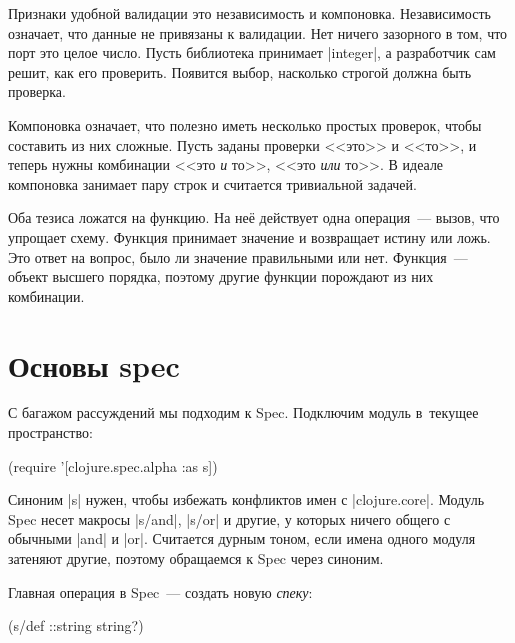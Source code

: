 
Признаки удобной валидации это независимость и компоновка. Независимость
означает, что данные не привязаны к валидации. Нет ничего зазорного в том, что
порт это целое число. Пусть библиотека принимает \spverb|integer|, а разработчик
сам решит, как его проверить. Появится выбор, насколько строгой должна быть
проверка.


Компоновка означает, что полезно иметь несколько простых проверок, чтобы
составить из них сложные. Пусть заданы проверки <<это>> и <<то>>, и теперь нужны
комбинации <<это \emph{и} то>>, <<это \emph{или} то>>. В идеале компоновка
занимает пару строк и считается тривиальной задачей.


Оба тезиса ложатся на функцию. На не\"{е} действует одна операция~--- вызов, что
упрощает схему. Функция принимает значение и возвращает истину или ложь. Это
ответ на вопрос, было ли значение правильными или нет. Функция~--- объект
высшего порядка, поэтому другие функции порождают из них комбинации.

\section{Основы spec}

С багажом рассуждений мы подходим к Spec. Подключим модуль в~текущее
пространство:

\begin{english}
  \begin{clojure}
(require '[clojure.spec.alpha :as s])
  \end{clojure}
\end{english}

Синоним \spverb|s| нужен, чтобы избежать конфликтов имен с
\spverb|clojure.core|. Модуль Spec несет макросы \spverb|s/and|, \spverb|s/or| и
другие, у которых ничего общего с обычными \spverb|and| и \spverb|or|. Считается
дурным тоном, если имена одного модуля затеняют другие, поэтому обращаемся к
Spec через синоним.


Главная операция в Spec~--- создать новую \emph{спеку}:

\begin{english}
  \begin{clojure}
(s/def ::string string?)
  \end{clojure}
\end{english}

